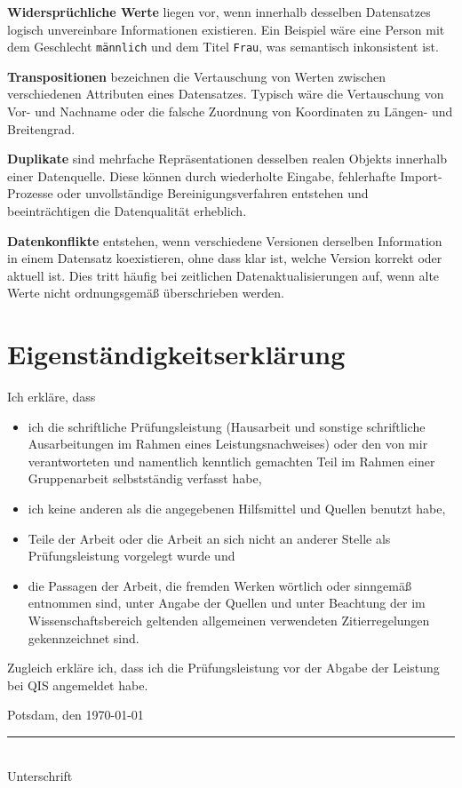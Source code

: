\documentclass[
    a4paper,
    12pt,
    headinclude=true,
    BCOR=10mm,
]{scrreprt}
\begin{document}
\textbf{Widersprüchliche Werte} liegen vor, wenn innerhalb desselben Datensatzes logisch unvereinbare Informationen existieren. Ein Beispiel wäre eine Person mit dem Geschlecht \texttt{männlich} und dem Titel \texttt{Frau}, was semantisch inkonsistent ist.

\textbf{Transpositionen} bezeichnen die Vertauschung von Werten zwischen verschiedenen Attributen eines Datensatzes. Typisch wäre die Vertauschung von Vor- und Nachname oder die falsche Zuordnung von Koordinaten zu Längen- und Breitengrad.

\textbf{Duplikate} sind mehrfache Repräsentationen desselben realen Objekts innerhalb einer Datenquelle. Diese können durch wiederholte Eingabe, fehlerhafte Import-Prozesse oder unvollständige Bereinigungsverfahren entstehen und beeinträchtigen die Datenqualität erheblich.

\textbf{Datenkonflikte} entstehen, wenn verschiedene Versionen derselben Information in einem Datensatz koexistieren, ohne dass klar ist, welche Version korrekt oder aktuell ist. Dies tritt häufig bei zeitlichen Datenaktualisierungen auf, wenn alte Werte nicht ordnungsgemäß überschrieben werden.



\newpage
{}
\chapter*{Eigenständigkeitserklärung}
Ich erkläre, dass
\begin{itemize}
    \item ich die schriftliche Prüfungsleistung (Hausarbeit und sonstige schriftliche Ausarbeitungen im Rahmen eines Leistungsnachweises) oder den von mir verantworteten und namentlich kenntlich gemachten Teil im Rahmen einer Gruppenarbeit selbstständig verfasst habe,
    \item ich keine anderen als die angegebenen Hilfsmittel und Quellen benutzt habe,
    \item Teile der Arbeit oder die Arbeit an sich nicht an anderer Stelle als Prüfungsleistung vorgelegt wurde und
    \item die Passagen der Arbeit, die fremden Werken wörtlich oder sinngemäß entnommen sind, unter Angabe der Quellen und unter Beachtung der im Wissenschaftsbereich geltenden allgemeinen verwendeten Zitierregelungen gekennzeichnet sind.
\end{itemize}

Zugleich erkläre ich, dass ich die Prüfungsleistung vor der Abgabe der Leistung bei QIS angemeldet habe.

\vspace{2cm}

\noindent
Potsdam, den \today

\vspace{2cm}

\noindent
\rule{6cm}{0.4pt}\\
Unterschrift

\printbibliography
\newpage
\appendix
\end{document}
